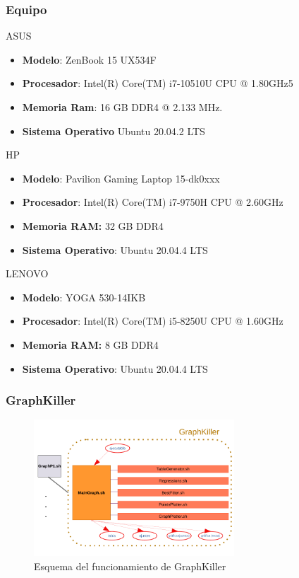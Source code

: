 \documentclass[8pt, aspectratio=169]{beamer}
\begin{document}
	\begin{frame}

        \frametitle{Equipo}

        \begin{block}{ASUS}
			\begin{itemize}
				\item \textbf{Modelo}: ZenBook 15 UX534F
				\item \textbf{Procesador}: Intel(R) Core(TM) i7-10510U CPU @ 1.80GHz5
				\item \textbf{Memoria Ram}: 16 GB DDR4 @ 2.133 MHz.
				\item \textbf{Sistema Operativo} Ubuntu 20.04.2 LTS
			\end{itemize}
		\end{block}
            
        \begin{block}{HP}
            \begin{itemize}
				\item \textbf{Modelo}: Pavilion Gaming Laptop 15-dk0xxx
				\item \textbf{Procesador}: Intel(R) Core(TM) i7-9750H CPU @ 2.60GHz
				\item \textbf{Memoria RAM:} 32 GB DDR4
				\item \textbf{Sistema Operativo}: Ubuntu 20.04.4 LTS
			\end{itemize}
        \end{block}

        \begin{block}{LENOVO}
            \begin{itemize}
				\item \textbf{Modelo}: YOGA 530-14IKB
				\item \textbf{Procesador}: Intel(R) Core(TM) i5-8250U CPU @ 1.60GHz
				\item \textbf{Memoria RAM:} 8 GB DDR4
				\item \textbf{Sistema Operativo}: Ubuntu 20.04.4 LTS
			\end{itemize}
        \end{block}
    \end{frame}

    \begin{frame}
        \frametitle{GraphKiller}    
        \begin{figure}[H]
			\centering
			\includegraphics[width=0.67\textwidth]{img/esquema_graphkiller.pdf}
			\caption{Esquema del funcionamiento de GraphKiller}
			\label{graph-killer}
		\end{figure}
    \end{frame}
\end{document}
